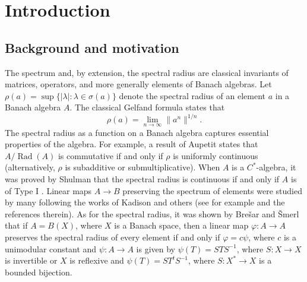 \documentclass[12pt]{amsart}
\numberwithin{equation}{section}
\theoremstyle{definition}
\begin{document}
\maketitle

\section{Introduction}


\subsection{Background and motivation}

The spectrum and, by extension, the spectral radius are classical invariants of matrices, operators, and more generally elements of Banach algebras. Let $\rho(a) = \sup\{|\lambda| : \lambda \in \sigma(a)\}$ denote the spectral radius of an element $a$ in a Banach algebra $A$. The classical Gelfand formula states that
\[
\rho(a) = \lim_{n \to \infty} \|a^n\|^{1/n}.
\]
The spectral radius as a function on a Banach algebra captures essential properties of the algebra. For example, a result of Aupetit \cite[Corollary 5.2.3]{Aupetit-primer} states that $A/\operatorname{Rad}(A)$ is commutative if and only if $\rho$ is uniformly continuous (alternatively, $\rho$ is subadditive or submultiplicative). When $A$ is a $C^*$-algebra, it was proved by Shulman that the spectral radius is continuous if and only if $A$ is of Type I \cite{Shulman-spec_rad_cont}. Linear maps $A \to B$ preserving the spectrum of elements were studied by many following the works of Kadison and others (see for example \cite{Aupetit-spec_preserv_map, AupMou-spec_preserv_map} and the references therein). As for the spectral radius, it was shown by Bre\v{s}ar and \v{S}merl that if $A = B(X)$, where $X$ is a Banach space, then a linear map $\varphi \colon A \to A$ preserves the spectral radius of every element if and only if $\varphi = c \psi$, where $c$ is a unimodular constant and $\psi \colon A \to A$ is given by $\psi(T) = S T S^{-1}$, where $S \colon X \to X$ is invertible or $X$ is reflexive and $\psi(T) = S T^t S^{-1}$, where $S \colon X^* \to X$ is a bounded bijection.
\end{document}
